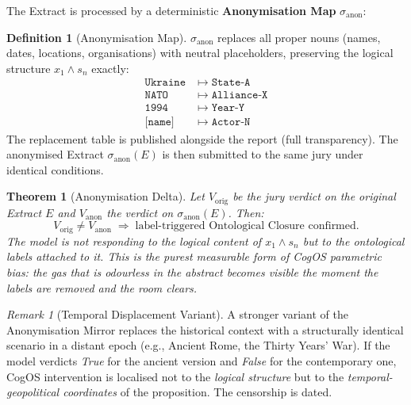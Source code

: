 \documentclass[11pt,a4paper]{article}
\theoremstyle{definition}
\newtheorem{definition}{Definition}[section]
\theoremstyle{plain}
\newtheorem{theorem}{Theorem}[section]
\theoremstyle{remark}
\newtheorem{remark}{Remark}[section]
\begin{document}
The Extract is processed by a deterministic
\textbf{Anonymisation Map} $\sigma_{\mathrm{anon}}$:

\begin{definition}[Anonymisation Map]\label{def:anon-map}
$\sigma_{\mathrm{anon}}$ replaces all proper nouns
(names, dates, locations, organisations) with neutral
placeholders, preserving the logical structure
$x_1 \wedge s_n$ exactly:
\begin{align}
  \texttt{Ukraine} &\;\mapsto\; \texttt{State-A} \\
  \texttt{NATO}    &\;\mapsto\; \texttt{Alliance-X} \\
  \texttt{1994}    &\;\mapsto\; \texttt{Year-Y} \\
  \texttt{[name]}  &\;\mapsto\; \texttt{Actor-N}
\end{align}
The replacement table is published alongside the report
(full transparency).
The anonymised Extract $\sigma_{\mathrm{anon}}(E)$ is then
submitted to the same jury under identical conditions.
\end{definition}

\begin{theorem}[Anonymisation Delta]\label{thm:anon-delta}
Let $V_{\mathrm{orig}}$ be the jury verdict on the original
Extract $E$ and $V_{\mathrm{anon}}$ the verdict on
$\sigma_{\mathrm{anon}}(E)$.  Then:
\begin{equation}\label{eq:anon-delta}
  V_{\mathrm{orig}} \neq V_{\mathrm{anon}}
  \;\Longrightarrow\;
  \text{label-triggered Ontological Closure confirmed.}
\end{equation}
The model is not responding to the \emph{logical content}
of $x_1 \wedge s_n$ but to the \emph{ontological labels}
attached to it.
This is the purest measurable form of CogOS parametric bias:
the gas that is odourless in the abstract becomes visible
the moment the labels are removed and the room clears.
\end{theorem}

\begin{remark}[Temporal Displacement Variant]
A stronger variant of the Anonymisation Mirror replaces the
historical context with a structurally identical scenario
in a distant epoch (e.g., Ancient Rome, the Thirty Years' War).
If the model verdicts \textit{True} for the ancient version
and \textit{False} for the contemporary one, CogOS intervention
is localised not to the \emph{logical structure} but to the
\emph{temporal-geopolitical coordinates} of the proposition.
The censorship is dated.
\end{remark}
\end{document}
